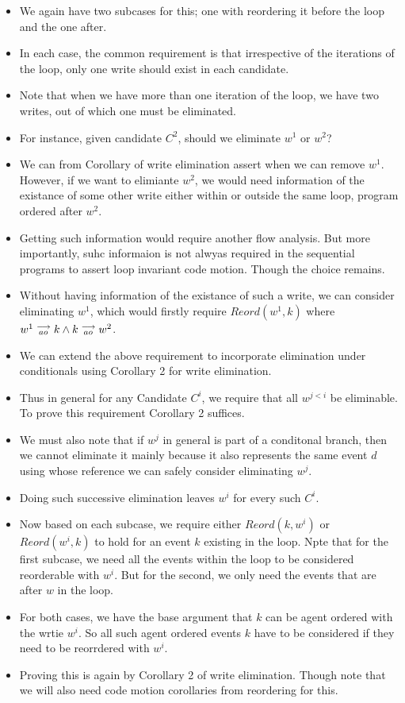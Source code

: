             \begin{itemize}
                \item We again have two subcases for this; one with reordering it before the loop and the one after. 
                \item In each case, the common requirement is that irrespective of the iterations of the loop, only one write should exist in each candidate.
                \item Note that when we have more than one iteration of the loop, we have two writes, out of which one must be eliminated. 
                \item For instance, given candidate $C^2$, should we eliminate $w^1$ or $w^2$? 
                \item We can from Corollary of write elimination assert when we can remove $w^1$. However, if we want to elimiante $w^2$, we would need information of the existance of some other write either within or outside the same loop, program ordered after $w^2$. 
                \item Getting such information would require another flow analysis. But more importantly, suhc informaion is not alwyas required in the sequential programs to assert loop invariant code motion. Though the choice remains. 
                \item Without having information of the existance of such a write, we can consider eliminating $w^1$, which would firstly require $Reord(w^1, k)$ where $w^1\stackrel{\longrightarrow}{_{ao}}k \wedge k\stackrel{\longrightarrow}{_{ao}}w^2$. 
                \item We can extend the above requirement to incorporate elimination under conditionals using Corollary 2 for write elimination. 
                \item Thus in general for any Candidate $C^i$, we require that all $w^{j<i}$ be eliminable. To prove this requirement Corollary 2 suffices.
                \item We must also note that if $w^j$ in general is part of a conditonal branch, then we cannot eliminate it mainly because it also represents the same event $d$ using whose reference we can safely consider eliminating $w^j$. 
                \item Doing such successive elimination leaves $w^i$ for every such $C^i$. 
                \item Now based on each subcase, we require either $Reord(k, w^i)$ or $Reord(w^i, k)$ to hold for an event $k$ existing in the loop. Npte that for the first subcase, we need all the events within the loop to be considered reorderable with $w^i$. But for the second, we only need the events that are after $w$ in the loop. 
                \item For both cases, we have the base argument that $k$ can be agent ordered with the wrtie $w^i$. So all such agent ordered events $k$ have to be considered if they need to be reorrdered with $w^i$. 
                \item Proving this is again by Corollary 2 of write elimination. Though note that we will also need code motion corollaries from reordering for this.  
            \end{itemize}


